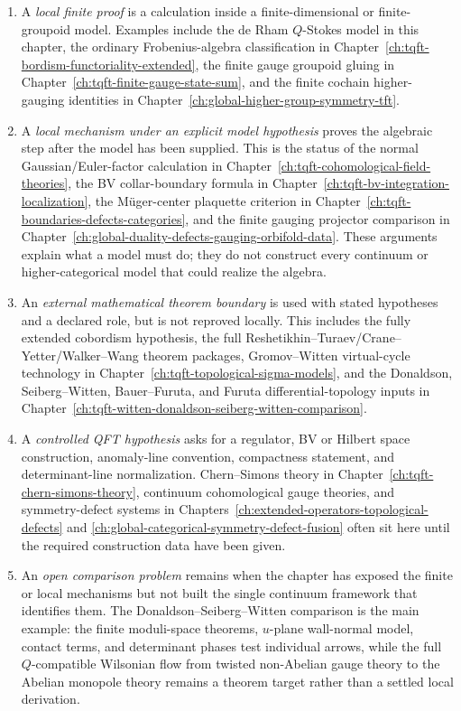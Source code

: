 \begin{enumerate}
\item A \emph{local finite proof} is a calculation inside a finite-dimensional
or finite-groupoid model.  Examples include the de Rham \(Q\)-Stokes model in
this chapter, the ordinary Frobenius-algebra classification in
Chapter~\ref{ch:tqft-bordism-functoriality-extended}, the finite gauge
groupoid gluing in Chapter~\ref{ch:tqft-finite-gauge-state-sum}, and the
finite cochain higher-gauging identities in
Chapter~\ref{ch:global-higher-group-symmetry-tft}.

\item A \emph{local mechanism under an explicit model hypothesis} proves the
algebraic step after the model has been supplied.  This is the status of the
normal Gaussian/Euler-factor calculation in
Chapter~\ref{ch:tqft-cohomological-field-theories}, the BV collar-boundary
formula in Chapter~\ref{ch:tqft-bv-integration-localization}, the
M\"uger-center plaquette criterion in
Chapter~\ref{ch:tqft-boundaries-defects-categories}, and the finite gauging
projector comparison in
Chapter~\ref{ch:global-duality-defects-gauging-orbifold-data}.  These
arguments explain what a model must do; they do not construct every continuum
or higher-categorical model that could realize the algebra.

\item An \emph{external mathematical theorem boundary} is used with stated
hypotheses and a declared role, but is not reproved locally.  This includes
the fully extended cobordism hypothesis, the full
Reshetikhin--Turaev/Crane--Yetter/Walker--Wang theorem packages,
Gromov--Witten virtual-cycle technology in
Chapter~\ref{ch:tqft-topological-sigma-models}, and the Donaldson,
Seiberg--Witten, Bauer--Furuta, and Furuta differential-topology inputs in
Chapter~\ref{ch:tqft-witten-donaldson-seiberg-witten-comparison}.

\item A \emph{controlled QFT hypothesis} asks for a regulator, BV or Hilbert
space construction, anomaly-line convention, compactness statement, and
determinant-line normalization.  Chern--Simons theory in
Chapter~\ref{ch:tqft-chern-simons-theory}, continuum cohomological gauge
theories, and symmetry-defect systems in
Chapters~\ref{ch:extended-operators-topological-defects} and
\ref{ch:global-categorical-symmetry-defect-fusion} often sit here until the
required construction data have been given.

\item An \emph{open comparison problem} remains when the chapter has exposed
the finite or local mechanisms but not built the single continuum framework
that identifies them.  The Donaldson--Seiberg--Witten comparison is the main
example: the finite moduli-space theorems, \(u\)-plane wall-normal model,
contact terms, and determinant phases test individual arrows, while the full
\(Q\)-compatible Wilsonian flow from twisted non-Abelian gauge theory to the
Abelian monopole theory remains a theorem target rather than a settled local
derivation.
\end{enumerate}

